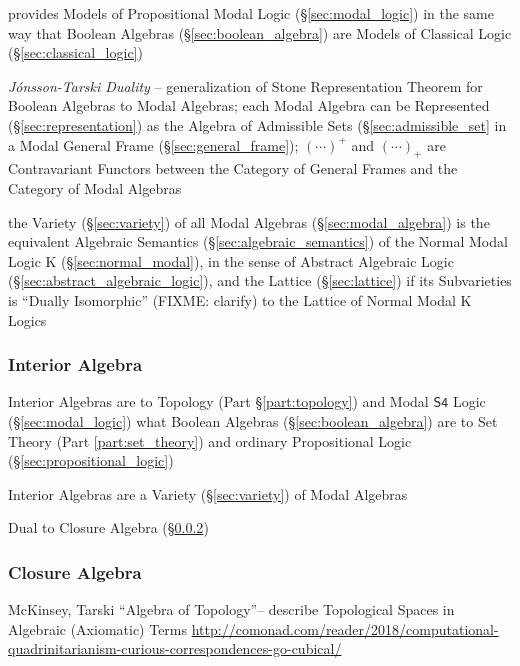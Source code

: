 provides Models of Propositional Modal Logic (\S\ref{sec:modal_logic}) in the
same way that Boolean Algebras (\S\ref{sec:boolean_algebra}) are Models of
Classical Logic (\S\ref{sec:classical_logic})

\emph{J\'onsson-Tarski Duality} -- generalization of Stone Representation
Theorem for Boolean Algebras to Modal Algebras; each Modal Algebra can be
Represented (\S\ref{sec:representation}) as the Algebra of Admissible Sets
(\S\ref{sec:admissible_set} in a Modal General Frame
(\S\ref{sec:general_frame}); $(\cdots)^+$ and $(\cdots)_+$ are Contravariant
Functors between the Category of General Frames and the Category of Modal
Algebras

the Variety (\S\ref{sec:variety}) of all Modal Algebras
(\S\ref{sec:modal_algebra}) is the equivalent Algebraic Semantics
(\S\ref{sec:algebraic_semantics}) of the Normal Modal Logic $\mathrm{K}$
(\S\ref{sec:normal_modal}), in the sense of Abstract Algebraic Logic
(\S\ref{sec:abstract_algebraic_logic}), and the Lattice (\S\ref{sec:lattice}) if
its Subvarieties is ``Dually Isomorphic'' (FIXME: clarify) to the Lattice of
Normal Modal $\mathrm{K}$ Logics



\subsubsection{Interior Algebra}\label{sec:interior_algebra}

Interior Algebras are to Topology (Part \S\ref{part:topology}) and Modal
$\mathsf{S4}$ Logic (\S\ref{sec:modal_logic}) what Boolean Algebras
(\S\ref{sec:boolean_algebra}) are to Set Theory (Part \ref{part:set_theory}) and
ordinary Propositional Logic (\S\ref{sec:propositional_logic})

Interior Algebras are a Variety (\S\ref{sec:variety}) of Modal Algebras

Dual to Closure Algebra (\S\ref{sec:closure_algebra})



\subsubsection{Closure Algebra}\label{sec:closure_algebra}

McKinsey, Tarski ``Algebra of Topology''-- describe Topological Spaces in
Algebraic (Axiomatic) Terms
\url{http://comonad.com/reader/2018/computational-quadrinitarianism-curious-correspondences-go-cubical/}

